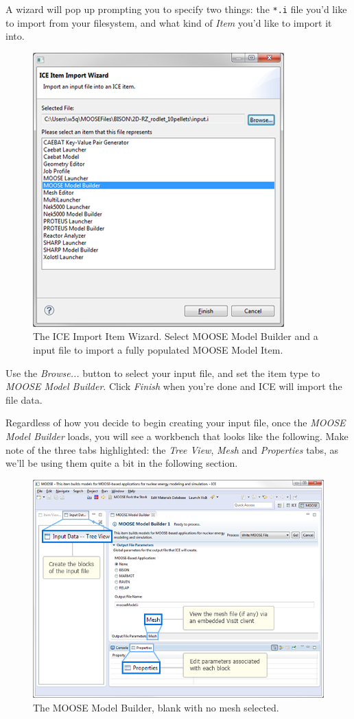 A wizard will pop up prompting you to specify two things: the
\texttt{*.i} file you'd like to import from your filesystem, and what
kind of \emph{Item} you'd like to import it into.

\begin{figure}[htbp]
\centering
\includegraphics[scale=.8]{figures/ICE_ImportMOOSEModelBuilder.png}
\caption{The ICE Import Item Wizard. Select MOOSE Model Builder and a input file to import a fully populated MOOSE Model Item.}
\end{figure}

Use the \emph{Browse...} button to select your input file, and set the
item type to \emph{MOOSE Model Builder}. Click \emph{Finish} when you're
done and ICE will import the file data.

Regardless of how you decide to begin creating your input file, once the
\emph{MOOSE Model Builder} loads, you will see a workbench that looks
like the following. Make note of the three tabs highlighted: the \emph{Tree
View}, \emph{Mesh} and \emph{Properties} tabs, as we'll be using them
quite a bit in the following section.

\begin{figure}[htbp]
\centering
\includegraphics[width=\textwidth]{figures/ICE_MOOSEModelBuilder.png}
\caption{The MOOSE Model Builder, blank with no mesh selected.}
\end{figure}

